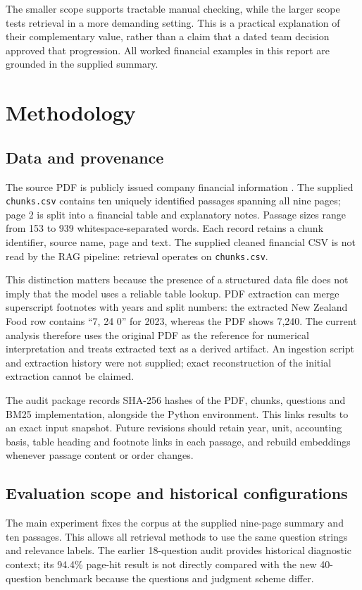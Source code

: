 \documentclass[11pt,a4paper]{article}
\begin{document}
The smaller scope supports tractable manual checking, while the larger scope tests retrieval in a more demanding setting. This is a practical explanation of their complementary value, rather than a claim that a dated team decision approved that progression. All worked financial examples in this report are grounded in the supplied summary.

\section{Methodology}
\subsection{Data and provenance}
The source PDF is publicly issued company financial information \cite{summary}. The supplied \texttt{chunks.csv} contains ten uniquely identified passages spanning all nine pages; page 2 is split into a financial table and explanatory notes. Passage sizes range from 153 to 939 whitespace-separated words. Each record retains a chunk identifier, source name, page and text. The supplied cleaned financial CSV is not read by the RAG pipeline: retrieval operates on \texttt{chunks.csv}.

This distinction matters because the presence of a structured data file does not imply that the model uses a reliable table lookup. PDF extraction can merge superscript footnotes with years and split numbers: the extracted New Zealand Food row contains ``7, 24 0'' for 2023, whereas the PDF shows 7,240. The current analysis therefore uses the original PDF as the reference for numerical interpretation and treats extracted text as a derived artifact. An ingestion script and extraction history were not supplied; exact reconstruction of the initial extraction cannot be claimed.

The audit package records SHA-256 hashes of the PDF, chunks, questions and BM25 implementation, alongside the Python environment. This links results to an exact input snapshot. Future revisions should retain year, unit, accounting basis, table heading and footnote links in each passage, and rebuild embeddings whenever passage content or order changes.

\subsection{Evaluation scope and historical configurations}
The main experiment fixes the corpus at the supplied nine-page summary and ten passages. This allows all retrieval methods to use the same question strings and relevance labels. The earlier 18-question audit provides historical diagnostic context; its 94.4\% page-hit result is not directly compared with the new 40-question benchmark because the questions and judgment scheme differ.
\end{document}
